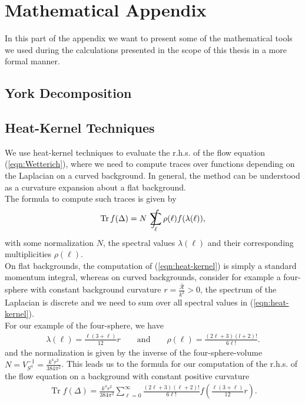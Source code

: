 \chapter{Mathematical Appendix}
In this part of the appendix we want to present some of the mathematical tools we used during the calculations presented in the scope of this thesis in a more formal manner.

\section{York Decomposition}
\blindtext

\section{Heat-Kernel Techniques}\label{sec:heat-kernel}
We use heat-kernel techniques to evaluate the r.h.s. of the flow equation (\ref{eqn:Wetterich}), where we need to compute traces over functions depending on the Laplacian on a curved background. In general, the method can be understood as a curvature expansion about a flat background. \\
The formula to compute such traces is given by
\begin{align}
	\operatorname{Tr} f(\Delta)= N \  \int\kern-1.3em\sum_{\ell} \rho(\ell) f(\lambda(\ell)),
	\label{eqn:heat-kernel}
\end{align}
with some normalization $N$, the spectral values $\lambda(\ell)$ and their corresponding multiplicities $\rho(\ell)$. \\
On flat backgrounds, the computation of (\ref{eqn:heat-kernel}) is simply a standard momentum integral, whereas on curved backgrounds, consider for example a four-sphere with constant background curvature $r = \frac{\bar{\mathcal{R}}}{k^2} > 0$, the spectrum of the Laplacian is discrete and we need to sum over all spectral values in (\ref{eqn:heat-kernel}). \\
For our example of the four-sphere, we have
\begin{align}
	\lambda(\ell) = \frac{\ell(3+\ell)}{12}r \qquad \text{and} \qquad \rho(\ell) = \frac{(2\ell + 3)(l+2)!}{6\ell!}.
\end{align}
and the normalization is given by the inverse of the four-sphere-volume $N= V_{S^4}^{-1} = \frac{k^4r^2}{384\pi^2}$. This leads us to the formula for our computation of the r.h.s. of the flow equation on a background with constant positive curvature
\begin{align}
\operatorname{Tr} f(\Delta)=\frac{k^{4} r^{2}}{384 \pi^{2}} \sum_{\ell=0}^{\infty} \frac{(2 \ell+3)(\ell+2) !}{6 \ell !} f\left(\frac{\ell(3+\ell)}{12} r\right)	.
\end{align}
